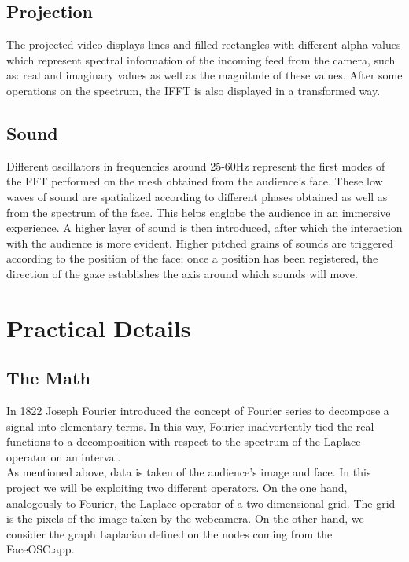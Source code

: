 \documentclass{article}
\begin{document}
\subsection{Projection}
The projected video displays lines and filled rectangles with different alpha values which represent spectral information of the incoming feed from the camera, such as: real and imaginary values as well as the magnitude of these values. After some operations on the spectrum, the IFFT is also displayed in a transformed way.

\subsection{Sound}
Different oscillators in frequencies around 25-60Hz represent the first modes of the FFT performed on the mesh obtained from the audience's face. These low waves of sound are spatialized according to different phases obtained as well as from the spectrum of the face. This helps englobe the audience in an immersive experience. A higher layer of sound is then introduced, after which the interaction with the audience is more evident. Higher pitched grains of sounds are triggered according to the position of the face; once a position has been registered, the direction of the gaze establishes the axis around which sounds will move.

\section{Practical Details}


\subsection{The Math}

\noindent In 1822 Joseph Fourier introduced the concept of Fourier series to decompose a signal into elementary terms. In this way, Fourier inadvertently tied the real functions to a decomposition with respect to the spectrum of the Laplace operator on an interval. \\


\noindent As mentioned above, data is taken of the audience's image and face. In this project we will be exploiting two different operators. On the one hand, analogously to Fourier, the Laplace operator of a two dimensional grid. The grid is the pixels of the image taken by the webcamera. On the other hand, we consider the graph Laplacian defined on the nodes coming from the FaceOSC.app.\\
\end{document}
